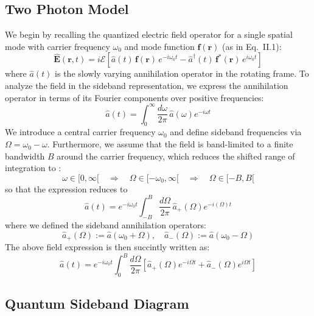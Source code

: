 \subsection{Two Photon Model }
We begin by recalling the quantized electric field operator for a single spatial mode with carrier frequency $\omega_0$ and mode function $\mathbf{f}(\mathbf{r})$ (as in Eq.~II.1):
\begin{equation}
\hat{\mathbf{E}}(\mathbf{r}, t) = i \mathcal{E} \left[ \hat{a}(t)\, \mathbf{f}(\mathbf{r})\, e^{-i \omega_0 t} - \hat{a}^\dagger(t)\, \mathbf{f}^*(\mathbf{r})\, e^{i \omega_0 t} \right]
\end{equation}
where $\hat{a}(t)$ is the slowly varying annihilation operator in the rotating frame.
To analyze the field in the sideband representation, we express the annihilation operator in terms of its Fourier components over positive frequencies:
\begin{equation}
\hat{a}(t) = \int_0^\infty \frac{d\omega}{2\pi} \, \hat{a}(\omega) e^{-i\omega t} 
\end{equation}
We introduce a central carrier frequency \( \omega_0 \) and define sideband frequencies via \( \Omega = \omega_0 - \omega \). Furthermore, we assume that the field is band-limited to a finite bandwidth \( B \) around the carrier frequency, which reduces the shifted range of integration to :
\[
\omega \in [0, \infty[ \quad \Rightarrow \quad \Omega \in [-\omega_0, \infty[ \quad \Rightarrow \quad \Omega \in [-B, B[
\]
so that the expression reduces to 
\begin{equation}
\hat{a}(t) 
= e^{-i \omega_0 t }\int_{-B}^{B} \frac{d\Omega}{2\pi} \, \hat{a}_+(\Omega)  e^{-i(\Omega)t}
\end{equation}
where we defined the sideband annihilation operators:
\begin{equation}
\hat{a}_+(\Omega) := \hat{a}(\omega_0 + \Omega), \quad
\hat{a}_-(\Omega) := \hat{a}(\omega_0 - \Omega)
\end{equation}
The above field expression is then succintly written as: 
\begin{equation}
  \hat{a}(t) = e^{-i \omega_0 t }\int_{0}^{B} \frac{d\Omega}{2\pi} \left[ \hat{a}_+(\Omega) e^{-i\Omega t} + \hat{a}_-(\Omega) e^{i\Omega t} \right]
\end{equation}



\subsection{Quantum Sideband Diagram }
